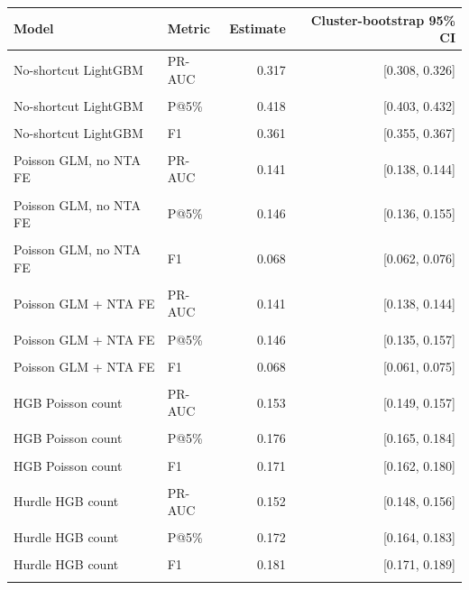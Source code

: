\begin{tabular}{@{}llrr@{}}
\toprule
Model & Metric & Estimate & Cluster-bootstrap 95\% CI \\
\midrule
No-shortcut LightGBM & PR-AUC & 0.317 & [0.308, 0.326] \\\\
No-shortcut LightGBM & P@5\% & 0.418 & [0.403, 0.432] \\\\
No-shortcut LightGBM & F1 & 0.361 & [0.355, 0.367] \\\\
Poisson GLM, no NTA FE & PR-AUC & 0.141 & [0.138, 0.144] \\\\
Poisson GLM, no NTA FE & P@5\% & 0.146 & [0.136, 0.155] \\\\
Poisson GLM, no NTA FE & F1 & 0.068 & [0.062, 0.076] \\\\
Poisson GLM + NTA FE & PR-AUC & 0.141 & [0.138, 0.144] \\\\
Poisson GLM + NTA FE & P@5\% & 0.146 & [0.135, 0.157] \\\\
Poisson GLM + NTA FE & F1 & 0.068 & [0.061, 0.075] \\\\
HGB Poisson count & PR-AUC & 0.153 & [0.149, 0.157] \\\\
HGB Poisson count & P@5\% & 0.176 & [0.165, 0.184] \\\\
HGB Poisson count & F1 & 0.171 & [0.162, 0.180] \\\\
Hurdle HGB count & PR-AUC & 0.152 & [0.148, 0.156] \\\\
Hurdle HGB count & P@5\% & 0.172 & [0.164, 0.183] \\\\
Hurdle HGB count & F1 & 0.181 & [0.171, 0.189] \\\\
\bottomrule
\end{tabular}
